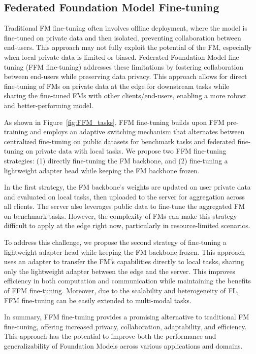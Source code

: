 \subsection{Federated Foundation Model Fine-tuning}
Traditional FM fine-tuning often involves offline deployment, where the model is fine-tuned on private data and then isolated, preventing collaboration between end-users. This approach may not fully exploit the potential of the FM, especially when local private data is limited or biased.
Federated Foundation Model fine-tuning (FFM fine-tuning) addresses these limitations by fostering collaboration between end-users while preserving data privacy. This approach allows for direct fine-tuning of FMs on private data at the edge for downstream tasks while sharing the fine-tuned FMs with other clients/end-users, enabling a more robust and better-performing model.

As shown in Figure~\ref{fig:FFM_tasks}, FFM fine-tuning builds upon FFM pre-training and employs an adaptive switching mechanism that alternates between centralized fine-tuning on public datasets for benchmark tasks and federated fine-tuning on private data with local tasks. We propose two FFM fine-tuning strategies: (1) directly fine-tuning the FM backbone, and (2) fine-tuning a lightweight adapter head while keeping the FM backbone frozen.

In the first strategy, the FM backbone's weights are updated on user private data and evaluated on local tasks, then uploaded to the server for aggregation across all clients. The server also leverages public data to fine-tune the aggregated FM on benchmark tasks. However, the complexity of FMs can make this strategy difficult to apply at the edge right now, particularly in resource-limited scenarios.

To address this challenge, we propose the second strategy of fine-tuning a lightweight adapter head while keeping the FM backbone frozen. This approach uses an adapter to transfer the FM's capabilities directly to local tasks, sharing only the lightweight adapter between the edge and the server. This improves efficiency in both computation and communication while maintaining the benefits of FFM fine-tuning. Moreover, due to the scalability and heterogeneity of FL, FFM fine-tuning can be easily extended to multi-modal tasks.

In summary, FFM fine-tuning provides a promising alternative to traditional FM fine-tuning, offering increased privacy, collaboration, adaptability, and efficiency. This approach has the potential to improve both the performance and generalizability of Foundation Models across various applications and domains.















